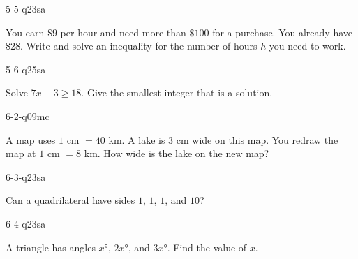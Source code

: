 \begin{practiceQuestion}{5-5-q23}{sa}
\begin{questionText}
You earn $\$9$ per hour and need more than $\$100$ for a purchase. You already have $\$28$. Write and solve an inequality for the number of hours $h$ you need to work.
\end{questionText}
\end{practiceQuestion}

\begin{practiceQuestion}{5-6-q25}{sa}
\begin{questionText}
Solve $7x - 3 \geq 18$. Give the smallest integer that is a solution.
\end{questionText}
\end{practiceQuestion}

\begin{practiceQuestion}{6-2-q09}{mc}
\begin{questionText}
A map uses $1$ cm $= 40$ km. A lake is $3$ cm wide on this map. You redraw the map at $1$ cm $= 8$ km. How wide is the lake on the new map?
\end{questionText}
\end{practiceQuestion}

\begin{practiceQuestion}{6-3-q23}{sa}
\begin{questionText}
Can a quadrilateral have sides $1$, $1$, $1$, and $10$?
\end{questionText}
\end{practiceQuestion}

\begin{practiceQuestion}{6-4-q23}{sa}
\begin{questionText}
A triangle has angles $x°$, $2x°$, and $3x°$. Find the value of $x$.
\end{questionText}
\end{practiceQuestion}

